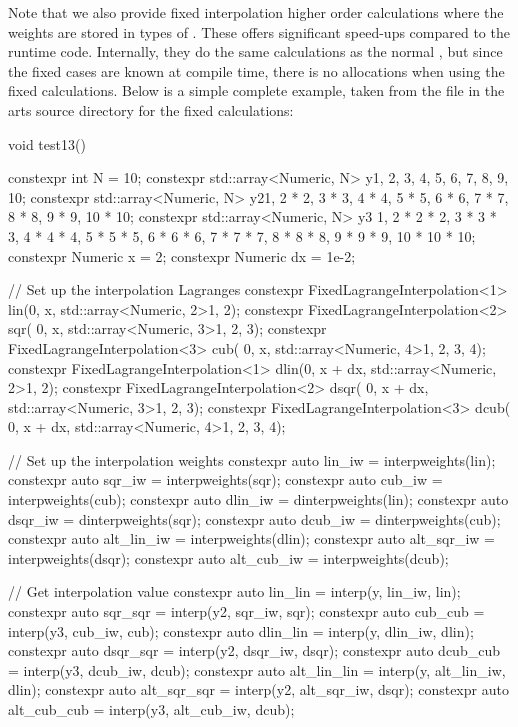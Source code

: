 Note that we also provide fixed interpolation higher order calculations where
the weights are stored in types of .
These offers significant speed-ups compared to the runtime code.  Internally,
they do the same calculations as the normal ,
but since the fixed cases are known at compile time, there is no allocations
when using the fixed calculations. Below is a simple complete example, taken from
the file  in the arts source directory for the fixed calculations: 

\begin{code}
void test13() {
  constexpr int N = 10;
  constexpr std::array<Numeric, N> y{1, 2, 3, 4, 5, 6, 7, 8, 9, 10};
  constexpr std::array<Numeric, N> y2{1,     2 * 2, 3 * 3, 4 * 4, 5 * 5,
                                      6 * 6, 7 * 7, 8 * 8, 9 * 9, 10 * 10};
  constexpr std::array<Numeric, N> y3{
      1,         2 * 2 * 2, 3 * 3 * 3, 4 * 4 * 4, 5 * 5 * 5,
      6 * 6 * 6, 7 * 7 * 7, 8 * 8 * 8, 9 * 9 * 9, 10 * 10 * 10};
  constexpr Numeric x = 2;
  constexpr Numeric dx = 1e-2;

  // Set up the interpolation Lagranges
  constexpr FixedLagrangeInterpolation<1> lin(0, x,
                                                std::array<Numeric, 2>{1, 2});
  constexpr FixedLagrangeInterpolation<2> sqr(
      0, x, std::array<Numeric, 3>{1, 2, 3});
  constexpr FixedLagrangeInterpolation<3> cub(
      0, x, std::array<Numeric, 4>{1, 2, 3, 4});
  constexpr FixedLagrangeInterpolation<1> dlin(0, x + dx,
                                                 std::array<Numeric, 2>{1, 2});
  constexpr FixedLagrangeInterpolation<2> dsqr(
      0, x + dx, std::array<Numeric, 3>{1, 2, 3});
  constexpr FixedLagrangeInterpolation<3> dcub(
      0, x + dx, std::array<Numeric, 4>{1, 2, 3, 4});

  // Set up the interpolation weights
  constexpr auto lin_iw = interpweights(lin);
  constexpr auto sqr_iw = interpweights(sqr);
  constexpr auto cub_iw = interpweights(cub);
  constexpr auto dlin_iw = dinterpweights(lin);
  constexpr auto dsqr_iw = dinterpweights(sqr);
  constexpr auto dcub_iw = dinterpweights(cub);
  constexpr auto alt_lin_iw = interpweights(dlin);
  constexpr auto alt_sqr_iw = interpweights(dsqr);
  constexpr auto alt_cub_iw = interpweights(dcub);

  // Get interpolation value
  constexpr auto lin_lin = interp(y, lin_iw, lin);
  constexpr auto sqr_sqr = interp(y2, sqr_iw, sqr);
  constexpr auto cub_cub = interp(y3, cub_iw, cub);
  constexpr auto dlin_lin = interp(y, dlin_iw, dlin);
  constexpr auto dsqr_sqr = interp(y2, dsqr_iw, dsqr);
  constexpr auto dcub_cub = interp(y3, dcub_iw, dcub);
  constexpr auto alt_lin_lin = interp(y, alt_lin_iw, dlin);
  constexpr auto alt_sqr_sqr = interp(y2, alt_sqr_iw, dsqr);
  constexpr auto alt_cub_cub = interp(y3, alt_cub_iw, dcub);

}
\end{code}
